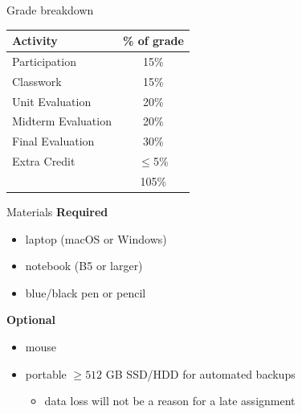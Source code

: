 \documentclass[aspectratio=169]{beamer}
\begin{document}
\begin{frame}{Grade breakdown}
    \begin{table}
    \centering
        \begin{tabular}{lc}
            \toprule
            \textbf{Activity}  & \textbf{\% of grade} \\
            \midrule
            Participation      & 15\% \\
            Classwork          & 15\% \\
            Unit Evaluation    & 20\% \\
            Midterm Evaluation & 20\% \\
            Final Evaluation   & 30\% \\
            Extra Credit       & \(\leq\)5\% \\
            \bottomrule
                               & 105\% \\
        \end{tabular}
    \end{table}   
\end{frame}


\begin{frame}{Materials}
    \textbf{Required}
    \begin{itemize}[label=--]
        \item laptop (macOS or Windows)
        \item notebook (B5 or larger)
        \item blue/black pen or pencil
    \end{itemize}
    \vspace{15pt}
    \textbf{Optional}
    \begin{itemize}[label=--]
        \item mouse
        \item portable \(\geq 512\) GB SSD/HDD for automated backups
            \begin{itemize}[label=\(\blacktriangleright\),itemsep=5pt]
                \item data loss will not be a reason for a late assignment
            \end{itemize}
    \end{itemize}
\end{frame}
\end{document}
